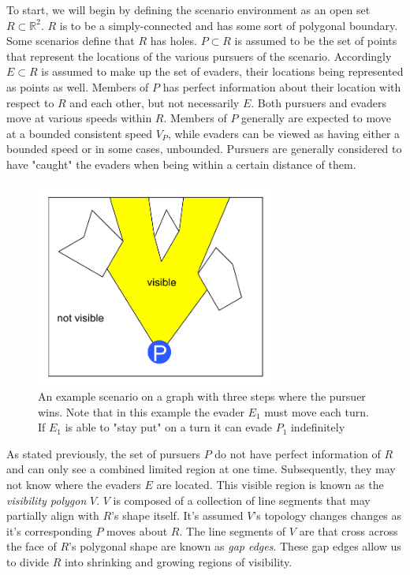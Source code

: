 \documentclass{article}
\begin{document}
To start, we will begin by defining the scenario environment as an open set \(R\subset\mathbb{R}^2\). \(R\) is to be a simply-connected and has some sort of polygonal boundary. Some scenarios define that \(R\) has holes. \(P\subset R\) is assumed to be the set of points that represent the locations of the various pursuers of the scenario. Accordingly \(E\subset R\) is assumed to make up the set of evaders, their locations being represented as points as well. Members of \(P\) has perfect information about their location with respect to \(R\) and each other, but not necessarily \(E\). Both pursuers and evaders move at various speeds within \(R\). Members of \(P\) generally are expected to move at a bounded consistent speed \(V_P\), while evaders can be viewed as having either a bounded speed or in some cases, unbounded. \cite{limVis, robotics} Pursuers are generally considered to have "caught" the evaders when being within a certain distance of them.

\begin{figure}[htb]
\centering
\includegraphics[width=0.7\textwidth]{"visPoly"}
\caption{An example scenario on a graph with three steps where the pursuer wins. Note that in this example the evader \(E_1\) must move each turn. If \(E_1\) is able to "stay put" on a turn it can evade \(P_1\) indefinitely}
\end{figure}


As stated previously, the set of pursuers \(P\) do not have perfect information of \(R\) and can only see a combined limited region at one time. Subsequently, they may not know where the evaders \(E\) are located. This visible region is known as the \emph{visibility polygon} \(V\). \(V\) is composed of a collection of line segments that may partially align with \(R\)'s shape itself. It's assumed \(V\)'s topology changes changes as it's corresponding \(P\) moves about \(R\). The line segments of \(V\) are that cross across the face of \(R\)'s polygonal shape are known as \emph{gap edges}. These gap edges allow us to divide \(R\) into shrinking and growing regions of visibility. \cite{limVis, robotics}
\end{document}
